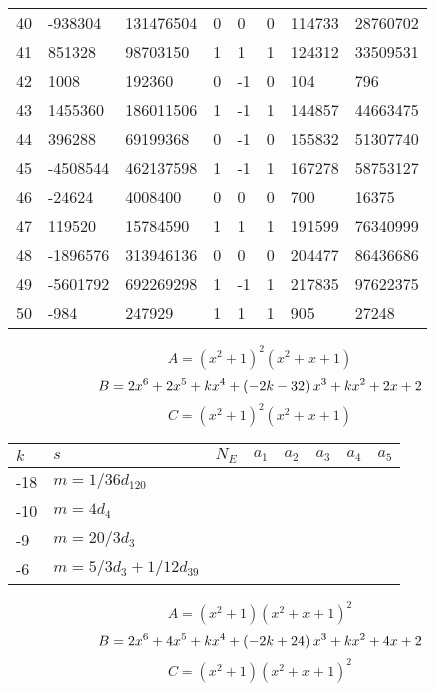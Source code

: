 \documentclass{amsart}
\begin{document}
\begin{longtable}{|l|l|l|lllll|}
40&-938304&131476504&0&0&0&114733&28760702\\
41&851328&98703150&1&1&1&124312&33509531\\
42&1008&192360&0&-1&0&104&796\\
43&1455360&186011506&1&-1&1&144857&44663475\\
44&396288&69199368&0&-1&0&155832&51307740\\
45&-4508544&462137598&1&-1&1&167278&58753127\\
46&-24624&4008400&0&0&0&700&16375\\
47&119520&15784590&1&1&1&191599&76340999\\
48&-1896576&313946136&0&0&0&204477&86436686\\
49&-5601792&692269298&1&-1&1&217835&97622375\\
50&-984&247929&1&1&1&905&27248\\
\hline
\end{longtable}
$$A=(x^2
 + 1)^{2}(x^2
 + x
 + 1)$$
$$B=2\*x^6
 + 2\*x^5
 + k\*x^4
 + \left(-2\*k
 - 32\right) \*x^3
 + k\*x^2
 + 2\*x
 + 2$$
$$C=(x^2
 + 1)^{2}(x^2
 + x
 + 1)$$
\begin{longtable}{|l|l|l|lllll|}
\hline
$k$ & $s$ & $N_E$ & $a_1$ & $a_2$ & $a_3$ & $a_4$ & $a_5$\\
\hline
-18&$m=1/36d_{120}$&&\multicolumn{5}{c|}{}\\
-10&$m=4d_{4}$&&\multicolumn{5}{c|}{}\\
-9&$m=20/3d_{3}$&&\multicolumn{5}{c|}{}\\
-6&$m=5/3d_{3}+1/12d_{39}$&&\multicolumn{5}{c|}{}\\
\hline
\end{longtable}
$$A=(x^2
 + 1)(x^2
 + x
 + 1)^{2}$$
$$B=2\*x^6
 + 4\*x^5
 + k\*x^4
 + \left(-2\*k
 + 24\right) \*x^3
 + k\*x^2
 + 4\*x
 + 2$$
$$C=(x^2
 + 1)(x^2
 + x
 + 1)^{2}$$
\end{document}
